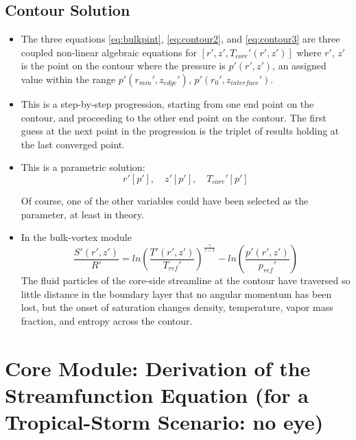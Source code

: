 \documentclass[preprint, prX]{revtex4}
\newcommand{\pfrac}[2]{\left(\frac{#1}{#2}\right)}
\newcommand{\gogmo}{\frac{\gamma}{\gamma-1}}
\newcommand{\rmin}{r_{min}}
\newcommand{\zedge}{z_{edge}}
\newcommand{\zinter}{z_{interface}}
\begin{document}
\subsection{Contour Solution}

\begin{itemize}
\item The three equations \eqref{eq:bulkpint}, \eqref{eq:contour2}, and \eqref{eq:contour3} are three coupled non-linear algebraic equations for $[r',z', T_{core}'(r',z')]$ where $r'$, $z'$ is the point on the contour where the pressure is $p'(r',z')$, an assigned value within the range $p'(\rmin', \zedge')$, $p'(r_0', \zinter')$.

\item This is a step-by-step progression, starting from one end point on the contour, and proceeding  to the other end point on the contour. The first guess at the next point in the progression is the triplet of results holding at the last converged point.

\item This is a parametric solution:
\begin{equation}
	r'[p'], \quad z'[p'], \quad  T_{core}'[p']
\end{equation}

Of course, one of the other variables could have been selected as the parameter, at least in theory.

\item In the bulk-vortex module
\begin{equation}
	\frac{S'(r',z')}{R'} = ln  \pfrac{T'(r',z')}{T_{ref}'} ^\gogmo - ln  \pfrac{p'(r',z')}{p_{ref}'}
\end{equation}
The fluid particles of the core-side streamline at the contour have traversed so little distance in the boundary layer that no angular momentum has been lost, but the onset of saturation changes density, temperature, vapor mass fraction, and entropy across the contour.
\end{itemize}

\section{Core Module: Derivation of the Streamfunction Equation (for a Tropical-Storm Scenario: no eye)}
\end{document}
